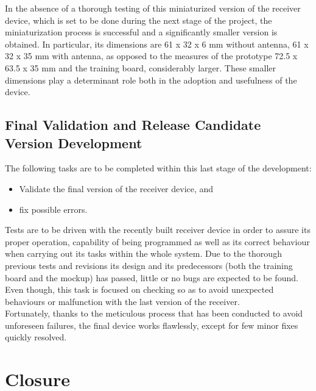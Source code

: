			In the absence of a thorough testing of this miniaturized version of the receiver device, which is set
			to be done during the next stage of the project, the miniaturization process is successful and a significantly
			smaller version is obtained. In particular, its dimensions are 61 x 32 x 6 mm without antenna, 61 x 32 x 35 mm
			with antenna, as opposed to the measures of the prototype 72.5 x 63.5 x 35 mm and the training board, considerably
			larger. These smaller dimensions play a determinant role both in the adoption and usefulness of the device.\\%

		\subsection{Final Validation and Release Candidate Version Development}
			The following tasks are to be completed within this last stage of the development:

			\begin{itemize}
				\item Validate the final version of the receiver device, and
				\item fix possible errors.
			\end{itemize}

			Tests are to be driven with the recently built receiver device in order to assure its
			proper operation, capability of being programmed as well as its correct behaviour when
			carrying out its tasks within the whole system. Due to the thorough previous tests and
			revisions its design and its predecessors (both the training board and the mockup) has
			passed, little or no bugs are expected to be found. Even though, this task is focused 
			on checking so as to avoid unexpected behaviours or malfunction with the last version
			of the receiver.\\

			Fortunately, thanks to the meticulous process that has been conducted to avoid unforeseen
			failures, the final device works flawlessly, except for few minor fixes quickly resolved.\\
		
		\section{Closure}
		\label{sec:hw-final}

